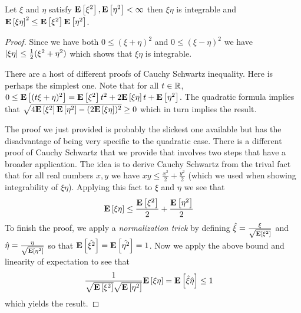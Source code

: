 \begin{lem}\label{CauchySchwartz}Let $\xi$
  and $\eta$ satisfy $\textbf{E}\left[\xi^2\right], \textbf{E}\left[\eta^2\right] < \infty$ then $\xi \eta$ is integrable and
  $\textbf{E}\left[\xi \eta\right]^2 \leq \textbf{E}\left[\xi^2\right]
  \textbf{E}\left[\eta^2\right]$.
\end{lem}
\begin{proof}
Since we have both $0 \leq (\xi + \eta)^2$ and $0 \leq (\xi - \eta)^2$
we have $\left \vert \xi \eta \right \vert \leq \frac{1}{2}(\xi^2 + \eta^2)$ which shows
that $\xi \eta$ is integrable.

There are a host of different proofs of Cauchy Schwartz inequality.  Here is perhaps
the simplest one.  Note that for all $t \in \mathbb{R}$, $0 \leq \textbf{E}\left[(t \xi +
\eta)^2\right] = \textbf{E}\left[\xi^2\right] t^2 + 2 \textbf{E}\left[\xi \eta\right] t +
\textbf{E}\left[\eta^2\right]$.  The quadratic formula implies that
$\sqrt{4 \textbf{E}\left[\xi^2\right] \textbf{E}\left[\eta^2\right] - (2
  \textbf{E}\left[\xi \eta\right])^2 } \geq 0$ which in turn implies the
result.

The proof we just provided is probably the slickest one available but
has the disadvantage of being very specific to the quadratic case.  
There is a different proof of Cauchy Schwartz that we provide that
involves two steps that have a broader application.  The idea is to
derive Cauchy Schwartz from the trival fact that for all real numbers
$x,y$ we have $xy \leq \frac{x^2}{2} + \frac{y^2}{2}$ (which we used when showing
integrability of $\xi\eta$).  Applying this fact to $\xi$ and $\eta$ we see
that
\begin{align*}
\textbf{E}\left[\xi \eta\right] &\leq \frac{\textbf{E}\left[\xi^2\right]}{2} + \frac{\textbf{E}\left[\eta^2\right]}{2}
\end{align*}
To finish the proof, we apply a \emph{normalization trick} by defining
$\hat{\xi} = \frac{\xi}{\sqrt{\textbf{E}\left[\xi^2\right]}}$ and $\hat{\eta} =
\frac{\eta}{\sqrt{\textbf{E}\left[\eta^2\right]}}$ so that
$\textbf{E}\left[\hat{\xi^2}\right] = \textbf{E}\left[\hat{\eta^2}\right] =1$.  Now we apply the above bound and linearity of expectation to see that
\begin{align*}
\frac{1}{\sqrt{\textbf{E}\left[\xi^2\right]}\sqrt{\textbf{E}\left[\eta^2\right]}}
\textbf{E}\left[\xi\eta\right] &= \textbf{E}\left[\hat{\xi}\hat{\eta}\right] \leq 1
\end{align*}
which yields the result.
\end{proof}

